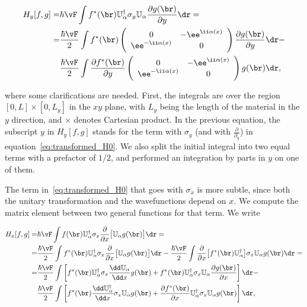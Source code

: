 \begin{align}
    H_{y}[f,g]  =& \hbar \vF  \int f^{\ast}(\br) \mathbb{U}_{\alpha}^{\dagger}\sigma_{y} \mathbb{U}_{\alpha}\frac{\partial g(\br)}{\partial y} \dr = \notag \\
    =& \frac{\hbar \vF}{2}\int f^{\ast}(\br)
        \left(\begin{array}{cc}
                0 & -\ee^{\ii \alpha(x)} \\
                \ee^{-\ii \alpha(x)}  & 0
              \end{array}\right)
              \frac{\partial g(\br)}{\partial y} \dr - \notag \\
    & \frac{\hbar \vF}{2}\int \frac{\partial f^{\ast}(\br)}{\partial y}
          \left(\begin{array}{cc}
            0 & -\ee^{\ii \alpha(x)}\\
            \ee^{-\ii \alpha(x)} & 0
        \end{array}\right)g(\br) \dr ,
\end{align}

\noindent where some clarifications are needed.
First, the integrals are over the region $[0,L] \times [0,L_y]$ in the $xy$ plane, with $L_y$ being the length of the material in the $y$ direction, and $\times$ denotes Cartesian product.
In the previous equation, the subscript $y$ in $H_{y}[f,g]$ stands for the term with $\sigma_{y}$ (and with $\frac{\partial}{\partial_y}$) in equation~\eqref{eq:transformed_H0}.
We also split the initial integral into two equal terms with a prefactor of $1/2$, and performed an integration by parts in $y$ on one of them.

The term in~\eqref{eq:transformed_H0} that goes with $\sigma_{x}$ is more subtle, since both the unitary transformation and the wavefunctions depend on $x$.
We compute the matrix element between two general functions for that term.
We write


\begin{align}
    H_{x}[f,g]  =& \hbar \vF \int f(\br) \mathbb{U}_{\alpha}^{\dagger} \sigma_{x} \frac{\partial}{\partial x}\big[\mathbb{U}_{\alpha} g(\br) \big] \dr = \notag \\
                =& \frac{\hbar \vF}{2} \int f^{\ast}(\br) \mathbb{U}_{\alpha}^{\dagger} \sigma_{x} \frac{\partial}{\partial x} \big[\mathbb{U}_{\alpha} g(\br)\big] \dr - \frac{\hbar \vF}{2} \int \frac{\partial}{\partial x} \big[f^{\ast}(\br)\mathbb{U}_{\alpha}^{\dagger}\big] \sigma_{x} \mathbb{U}_{\alpha} g(\br) \dr = \notag \\
                =& \frac{\hbar \vF}{2} \int \left[f^{\ast}(\br) \mathbb{U}_{\alpha}^{\dagger} \sigma_{x} \frac{\dd \mathbb{U}_{\alpha}}{\dd x} g(\br) +  f^{\ast}(\br) \mathbb{U}_{\alpha}^{\dagger} \sigma_{x} \mathbb{U}_{\alpha} \frac{\partial g(\br)}{\partial x} \right] \dr - \notag \\
                 & \frac{\hbar \vF}{2} \int \left[f^{\ast}(\br) \frac{\dd \mathbb{U}_{\alpha}^{\dagger}}{\dd x} \sigma_{x} \mathbb{U}_{\alpha} g(\br) + \frac{\partial f^{\ast}(\br)}{\partial x} \mathbb{U}_{\alpha}^{\dagger} \sigma_{x} \mathbb{U}_{\alpha} g(\br) \right] \dr ,
\end{align}


